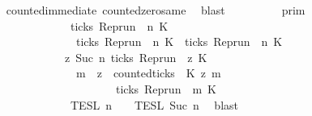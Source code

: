 \begin{isabellebody}
\ \ \ \ \ \ \isamarkupfalse%
\ counted{\isacharunderscore}immediate\ counted{\isacharunderscore}zero{\isacharunderscore}same\ \isamarkupfalse%
\ blast\isanewline
\ \ \isamarkupfalse%
\ \isamarkupfalse%
\ {\isacartoucheopen}{\isachardot}{\isachardot}{\isachardot}\ {\isacharequal}\ {\isasymlbrakk}{\isasymlbrakk}\ {\isasymGamma}\ {\isasymrbrakk}{\isasymrbrakk}\isactrlsub p\isactrlsub r\isactrlsub i\isactrlsub m\isanewline
\ \ \ \ \ \ \ \ \ \ \ \ \ \ \ \ {\isasyminter}\ {\isacharparenleft}\ {\isacharbraceleft}{\isasymrho}{\isachardot}\ {\isasymnot}ticks\ {\isacharparenleft}{\isacharparenleft}Rep{\isacharunderscore}run\ {\isasymrho}{\isacharparenright}\ n\ K\isanewline
\ \ \ \ \ \ \ \ \ \ \ \ \ \ \ \ \ \ {\isasymunion}\ {\isacharbraceleft}{\isasymrho}{\isachardot}\ ticks\ {\isacharparenleft}{\isacharparenleft}Rep{\isacharunderscore}run\ {\isasymrho}{\isacharparenright}\ n\ K\ {\isasymand}\ ticks\ {\isacharparenleft}{\isacharparenleft}Rep{\isacharunderscore}run\ {\isasymrho}{\isacharparenright}\ n\ K\ {\isacharparenright}\isanewline
\ \ \ \ \ \ \ \ \ \ \ \ \ \ \ \ {\isasyminter}\ {\isacharbraceleft}{\isasymrho}{\isachardot}\ {\isasymforall}z{\isasymge}\ Suc\ n{\isachardot}\ ticks\ {\isacharparenleft}{\isacharparenleft}Rep{\isacharunderscore}run\ {\isasymrho}{\isacharparenright}\ z\ K\ {\isasymlongrightarrow}\isanewline
\ \ \ \ \ \ \ \ \ \ \ \ \ \ \ \ \ \ \ \ {\isacharparenleft}{\isasymforall}m\ {\isasymge}\ z{\isachardot}\ \ counted{\isacharunderscore}ticks\ {\isasymrho}\ K\ z\ m\ {}\isanewline
\ \ \ \ \ \ \ \ \ \ \ \ \ \ \ \ \ \ \ \ \ \ \ \ \ \ {\isasymlongrightarrow}\ ticks\ {\isacharparenleft}{\isacharparenleft}Rep{\isacharunderscore}run\ {\isasymrho}{\isacharparenright}\ m\ K\ {\isacharbraceright}\isanewline
\ \ \ \ \ \ \ \ \ \ \ \ \ \ \ \ {\isasyminter}\ {\isasymlbrakk}{\isasymlbrakk}\ {\isasymPsi}\ {\isasymrbrakk}{\isasymrbrakk}\isactrlsub T\isactrlsub E\isactrlsub S\isactrlsub L\isactrlbsup {\isasymge}\ n\isactrlesup \ {\isasyminter}\ {\isasymlbrakk}{\isasymlbrakk}\ {\isasymPhi}\ {\isasymrbrakk}{\isasymrbrakk}\isactrlsub T\isactrlsub E\isactrlsub S\isactrlsub L\isactrlbsup {\isasymge}\ Suc\ n\isactrlesup {\isacartoucheclose}\ \isamarkupfalse%
\ blast\isanewline

\end{isabellebody}
